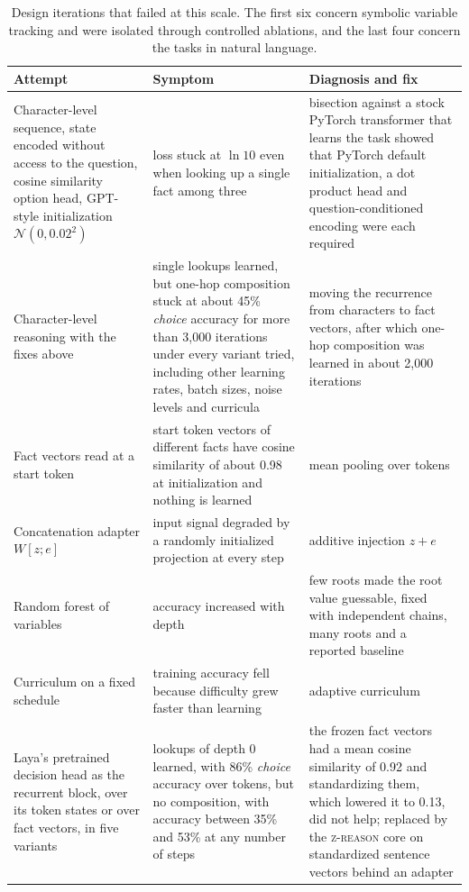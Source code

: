 \documentclass{article}
\newcommand{\zr}{\textsc{z-reason}}
\begin{document}
\begin{table}[t]
\centering
\small
\caption{Design iterations that failed at this scale. The first six concern symbolic variable tracking and were isolated through controlled ablations, and the last four concern the tasks in natural language.}
\label{tab:lessons}
\begin{tabular}{@{}p{4.6cm}p{4.5cm}p{4.9cm}@{}}
\toprule
Attempt & Symptom & Diagnosis and fix \\
\midrule
Character-level sequence, state encoded without access to the question, cosine similarity option head, GPT-style initialization $\mathcal{N}(0, 0.02^2)$ & loss stuck at $\ln 10$ even when looking up a single fact among three & bisection against a stock PyTorch transformer that learns the task showed that PyTorch default initialization, a dot product head and question-conditioned encoding were each required \\
Character-level reasoning with the fixes above & single lookups learned, but one-hop composition stuck at about 45\% \emph{choice} accuracy for more than 3{,}000 iterations under every variant tried, including other learning rates, batch sizes, noise levels and curricula & moving the recurrence from characters to fact vectors, after which one-hop composition was learned in about 2{,}000 iterations \\
Fact vectors read at a start token & start token vectors of different facts have cosine similarity of about 0.98 at initialization and nothing is learned & mean pooling over tokens \\
Concatenation adapter $W[z; e]$ \cite{geiping2025scaling} & input signal degraded by a randomly initialized projection at every step & additive injection $z + e$ \cite{bai2019deq, jolicoeur2025trm} \\
Random forest of variables & accuracy increased with depth & few roots made the root value guessable, fixed with independent chains, many roots and a reported baseline \\
Curriculum on a fixed schedule & training accuracy fell because difficulty grew faster than learning & adaptive curriculum \\
Laya's pretrained decision head as the recurrent block, over its token states or over fact vectors, in five variants & lookups of depth 0 learned, with 86\% \emph{choice} accuracy over tokens, but no composition, with accuracy between 35\% and 53\% at any number of steps & the frozen fact vectors had a mean cosine similarity of 0.92 and standardizing them, which lowered it to 0.13, did not help; replaced by the \zr{} core on standardized sentence vectors behind an adapter \\

\end{tabular}
\end{table}
\end{document}
